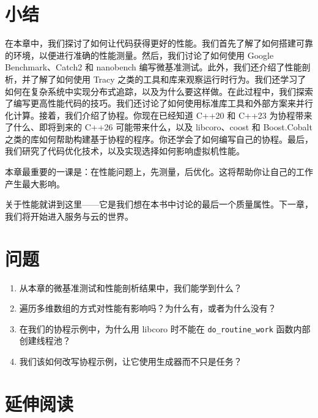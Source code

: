 \section{小结}

在本章中，我们探讨了如何让代码获得更好的性能。我们首先了解了如何搭建可靠的环境，以便进行准确的性能测量。然后，我们讨论了如何使用 Google Benchmark、Catch2 和 nanobench 编写微基准测试。此外，我们还介绍了性能剖析，并了解了如何使用 Tracy 之类的工具和库来观察运行时行为。我们还学习了如何在复杂系统中实现分布式追踪，以及为什么要这样做。在此过程中，我们探索了编写更高性能代码的技巧。我们还讨论了如何使用标准库工具和外部方案来并行化计算。接着，我们介绍了协程。你现在已经知道 C++20 和 C++23 为协程带来了什么、即将到来的 C++26 可能带来什么，以及 libcoro、coost 和 Boost.Cobalt 之类的库如何帮助构建基于协程的程序。你还学会了如何编写自己的协程。最后，我们研究了代码优化技术，以及实现选择如何影响虚拟机性能。

本章最重要的一课是：在性能问题上，先测量，后优化。这将帮助你让自己的工作产生最大影响。

关于性能就讲到这里——它是我们想在本书中讨论的最后一个质量属性。下一章，我们将开始进入服务与云的世界。

\section{问题}

\begin{enumerate}
\item 从本章的微基准测试和性能剖析结果中，我们能学到什么？
\item 遍历多维数组的方式对性能有影响吗？为什么有，或者为什么没有？
\item 在我们的协程示例中，为什么用 libcoro 时不能在 \texttt{do\_\allowbreak{}routine\_\allowbreak{}work} 函数内部创建线程池？
\item 我们该如何改写协程示例，让它使用生成器而不只是任务？
\end{enumerate}

\section{延伸阅读}

